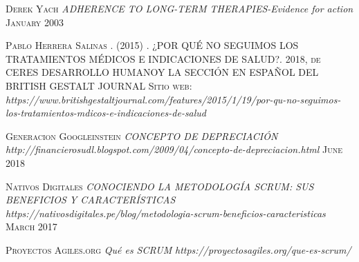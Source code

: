\begin{thebibliography}{X}
	 \textsc{Derek Yach} \textit{ADHERENCE TO LONG-TERM THERAPIES-Evidence for action
} \textsc{January 2003}
	
	 \textsc{Pablo Herrera Salinas . (2015)} \textsc{. ¿POR QUÉ NO SEGUIMOS LOS TRATAMIENTOS MÉDICOS E INDICACIONES DE SALUD?. 2018, de CERES DESARROLLO HUMANOY LA SECCIÓN EN ESPAÑOL DEL BRITISH GESTALT JOURNAL Sitio web:} \textit{https://www.britishgestaltjournal.com/features/2015/1/19/por-qu-no-seguimos-los-tratamientos-mdicos-e-indicaciones-de-salud}

	 \textsc{Generacion Googleinstein} \textit{CONCEPTO DE DEPRECIACIÓN} \textit{http://financierosudl.blogspot.com/2009/04/concepto-de-depreciacion.html} \textsc{June 2018}
	
	 \textsc{Nativos Digitales} \textit{CONOCIENDO LA METODOLOGÍA SCRUM: SUS BENEFICIOS Y CARACTERÍSTICAS} \textit{https://nativosdigitales.pe/blog/metodologia-scrum-beneficios-caracteristicas} \textsc{March 2017}
	
	
	
	 \textsc{Proyectos Agiles.org} \textit{Qué es SCRUM} \textit{https://proyectosagiles.org/que-es-scrum/} 
	
	 
	
	 
\end{thebibliography}